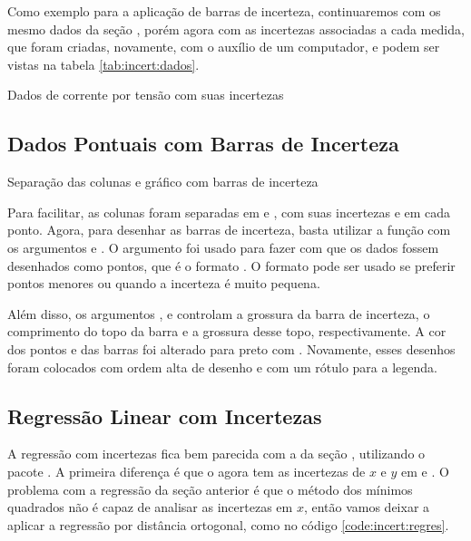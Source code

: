 Como exemplo para a aplicação de barras de incerteza, continuaremos com os mesmo dados da seção , porém agora com as incertezas associadas a cada medida, que foram criadas, novamente, com o auxílio de um computador, e podem ser vistas na tabela \ref{tab:incert:dados}.

\begin{table}[H]
    \centering
    
    \caption{Dados de corrente por tensão com suas incertezas}
    \label{tab:incert:dados}
\end{table}


\subsection{Dados Pontuais com Barras de Incerteza}

    \begin{listing}[H]
        \caption{Separação das colunas e gráfico com barras de incerteza}
        \label{code:incert:dados}

    \end{listing}

    Para facilitar, as colunas foram separadas em  e , com suas incertezas  e  em cada ponto. Agora, para desenhar as barras de incerteza, basta utilizar a função  com os argumentos  e . O argumento  foi usado para fazer com que os dados fossem desenhados como pontos, que é o formato . O formato  pode ser usado se preferir pontos menores ou quando a incerteza é muito pequena.

    Além disso, os argumentos ,  e  controlam a grossura da barra de incerteza, o comprimento do topo da barra e a grossura desse topo, respectivamente. A cor dos pontos e das barras foi alterado para preto com . Novamente, esses desenhos foram colocados com ordem alta de desenho e com um rótulo para a legenda.


\subsection{Regressão Linear com Incertezas}

    A regressão com incertezas fica bem parecida com a da seção , utilizando o pacote . A primeira diferença é que o  agora tem as incertezas de $x$ e $y$ em  e . O problema com a regressão da seção anterior é que o método dos mínimos quadrados não é capaz de analisar as incertezas em $x$, então vamos deixar a  aplicar a regressão por distância ortogonal, como no código \ref{code:incert:regres}.

